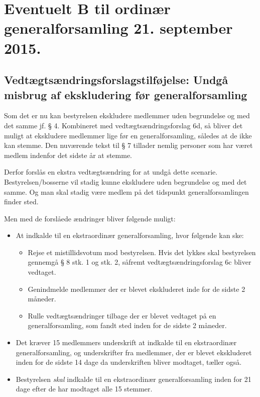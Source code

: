 \documentclass[a4paper,11pt]{report}
\begin{document}
\section*{Eventuelt B til ordinær generalforsamling 21. september 2015.}

\subsection*{Vedtægtsændringsforslagstilføjelse: Undgå misbrug af ekskludering
før generalforsamling}

Som det er nu kan bestyrelsen ekskludere medlemmer uden begrundelse og med det
samme jf. § 4.  Kombineret med vedtægtsændringsforslag 6d, så bliver det
muligt at ekskludere medlemmer lige før en generalforsamling, således at de ikke
kan stemme.  Den nuværende tekst til § 7 tillader nemlig personer som har
været medlem indenfor det sidste år at stemme.

Derfor forslås en ekstra vedtægtsændring for at undgå dette scenarie.
Bestyrelsen/bosserne vil stadig kunne ekskludere uden begrundelse og med det
samme.  Og man skal stadig være medlem på det tidspunkt generalforsamlingen
finder sted.

Men med de forslåede ændringer bliver følgende muligt:

\begin{itemize}
\item At indkalde til en ekstraordinær generalforsamling, hvor følgende kan ske:
\begin{itemize}
\item Rejse et mistillidsvotum mod bestyrelsen.  Hvis det lykkes skal
bestyrelsen gennemgå § 8 stk. 1 og stk. 2, såfremt vedtægtsændringsforslag 6c
bliver vedtaget.
\item Genindmelde medlemmer der er blevet ekskluderet inde for de sidste 2
måneder.
\item Rulle vedtægtsændringer tilbage der er blevet vedtaget på en
generalforsamling, som fandt sted inden for de sidste 2 måneder.
\end{itemize}
\item Det kræver 15 medlemmers underskrift at indkalde til en ekstraordinær
generalforsamling, og underskrifter fra medlemmer, der er blevet ekskluderet
inden for de sidste 14 dage da underskriften bliver modtaget, tæller også.
\item Bestyrelsen \emph{skal} indkalde til en ekstraordinær
generalforsamling inden for 21 dage efter de har modtaget alle 15 stemmer.
\end{itemize}
\end{document}
